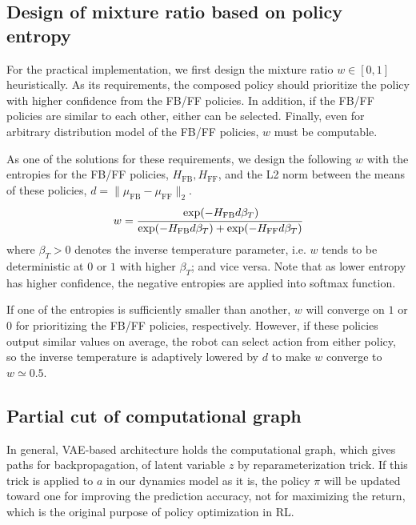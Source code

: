 \documentclass{bmcart}
\begin{document}
\subsection{Design of mixture ratio based on policy entropy}

For the practical implementation, we first design the mixture ratio $w \in [0, 1]$ heuristically.
As its requirements, the composed policy should prioritize the policy with higher confidence from the FB/FF policies.
In addition, if the FB/FF policies are similar to each other, either can be selected.
Finally, even for arbitrary distribution model of the FB/FF policies, $w$ must be computable.

As one of the solutions for these requirements, we design the following $w$ with the entropies for the FB/FF policies, $H_\mathrm{FB}, H_\mathrm{FF}$, and the L2 norm between the means of these policies, $d = \| \mu_\mathrm{FB} - \mu_\mathrm{FF} \|_2$.
\begin{align}
    w = \cfrac{\exp(-H_\mathrm{FB} d \beta_T)}{\exp(-H_\mathrm{FB} d \beta_T) + \exp(-H_\mathrm{FF} d \beta_T)}
    \label{eq:policy_mix_ratio}
\end{align}
where $\beta_T > 0$ denotes the inverse temperature parameter, i.e. $w$ tends to be deterministic at $0$ or $1$ with higher $\beta_T$; and vice versa.
Note that as lower entropy has higher confidence, the negative entropies are applied into softmax function.

If one of the entropies is sufficiently smaller than another, $w$ will converge on $1$ or $0$ for prioritizing the FB/FF policies, respectively.
However, if these policies output similar values on average, the robot can select action from either policy, so the inverse temperature is adaptively lowered by $d$ to make $w$ converge to $w \simeq 0.5$.

\subsection{Partial cut of computational graph}

In general, VAE-based architecture holds the computational graph, which gives paths for backpropagation, of latent variable $z$ by reparameterization trick.
If this trick is applied to $a$ in our dynamics model as it is, the policy $\pi$ will be updated toward one for improving the prediction accuracy, not for maximizing the return, which is the original purpose of policy optimization in RL.
\end{document}
